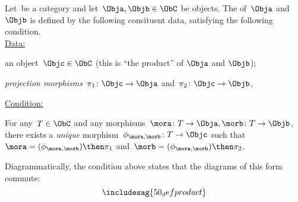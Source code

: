 \begin{ctdefinition}
    Let~\CatC be a category and let~$\Obja, \Objb \in \ObC$ be objects. The \emph{} of~$\Obja$ and~$\Objb$ is defined by the following consituent data, satisfying the following condition. \\
    \underline{Data:}
    \begin{compactenum}
        \item an object~$\Objc \in \ObC$ (this is ``the product'' of $\Obja$  and $\Objb$);
        \item \emph{projection morphisms}~$\pi_1 \colon \Objc \to \Obja$ and~$\pi_2 \colon \Objc \to \Objb$,
    \end{compactenum}
    \underline{Condition:}
    \begin{compactenum}
        \item For any~$T \in \ObC$ and any morphisms~$\mora \colon T \to \Obja, \morb \colon T \to \Objb$, there exists a \emph{unique} morphism~$\phi_{\mora,\morb} \colon T \to \Objc$ such that~$\mora = (\phi_{\mora,
            \morb})\then \pi_1$ and~$\morb=(\phi_{\mora, \morb})\then \pi_2$.
    \end{compactenum}
\end{ctdefinition}

\begin{remark}
    Diagrammatically, the condition above states that the diagrams of this form commute:
    \begin{equation}
        \includesag{50_defproduct}
    \end{equation}
\end{remark}

